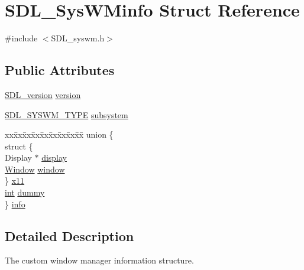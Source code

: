 \hypertarget{struct_s_d_l___sys_w_minfo}{\section{S\-D\-L\-\_\-\-Sys\-W\-Minfo Struct Reference}
\label{struct_s_d_l___sys_w_minfo}
}


{\ttfamily \#include $<$S\-D\-L\-\_\-syswm.\-h$>$}

\subsection*{Public Attributes}
\begin{DoxyCompactItemize}
\item 
\hyperlink{struct_s_d_l__version}{S\-D\-L\-\_\-version} \hyperlink{struct_s_d_l___sys_w_minfo_ac3a70af022d4849e9ff546595e94627f}{version}
\item 
\hyperlink{_s_d_l__syswm_8h_a064c26598287280fff2a00d6758ac4f7}{S\-D\-L\-\_\-\-S\-Y\-S\-W\-M\-\_\-\-T\-Y\-P\-E} \hyperlink{struct_s_d_l___sys_w_minfo_a438b6a06ab3ee417293c7b7fc5a23855}{subsystem}
\item 
\begin{tabbing}
xx\=xx\=xx\=xx\=xx\=xx\=xx\=xx\=xx\=\kill
union \{\\
\>struct \{\\
\>\>Display $\ast$ \hyperlink{struct_s_d_l___sys_w_minfo_a58ef8bc8e1065e95e75a08d08f4a4741}{display}\\
\>\>\hyperlink{state_editor_8cpp_a6f567238a0aaa00ab1b336d0cf0faf4b}{Window} \hyperlink{struct_s_d_l___sys_w_minfo_a83ca4b0f4bdf67a0edee03d5bde86b93}{window}\\
\>\} \hyperlink{struct_s_d_l___sys_w_minfo_a00ee462de755dce0807b5a9f8a2be12b}{x11}\\
\>\hyperlink{_s_d_l__thread_8h_a6a64f9be4433e4de6e2f2f548cf3c08e}{int} \hyperlink{struct_s_d_l___sys_w_minfo_a1edbb8fc4fc59081efe6070f9167c1cf}{dummy}\\
\} \hyperlink{struct_s_d_l___sys_w_minfo_ab928935e7f73776e61ecc4c169a146f2}{info}\\

\end{tabbing}\end{DoxyCompactItemize}


\subsection{Detailed Description}
The custom window manager information structure.


